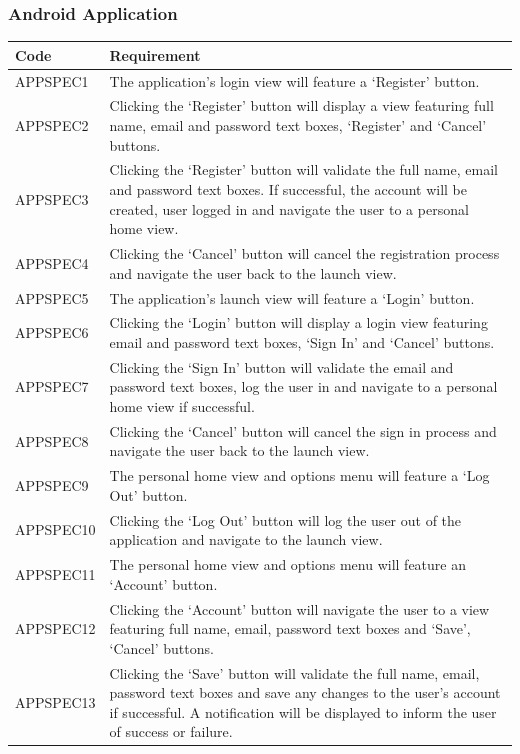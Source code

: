 \documentclass[11pt,a4paper]{article}
\begin{document}
\subsubsection{Android Application}

\begin{longtable}{|p{2.5cm}p{13cm}|}
\hline
\textbf{Code} & \textbf{Requirement} \\

\hline
APPSPEC1 & The application's login view will feature a `Register' button. \\ \hline
APPSPEC2 & Clicking the `Register' button will display a view featuring full name, email and password text boxes, `Register' and `Cancel' buttons. \\ \hline
APPSPEC3 & Clicking the `Register' button will validate the full name, email and password text boxes. If successful, the account will be created, user logged in and navigate the user to a personal home view. \\ \hline
APPSPEC4 & Clicking the `Cancel' button will cancel the registration process and navigate the user back to the launch view. \\ \hline
APPSPEC5 & The application's launch view will feature a `Login' button. \\ \hline
APPSPEC6 & Clicking the `Login' button will display a login view featuring email and password text boxes, `Sign In' and `Cancel' buttons. \\ \hline
APPSPEC7 & Clicking the `Sign In' button will validate the email and password text boxes, log the user in and navigate to a personal home view if successful. \\ \hline
APPSPEC8 & Clicking the `Cancel' button will cancel the sign in process and navigate the user back to the launch view. \\ \hline
APPSPEC9 & The personal home view and options menu will feature a `Log Out' button. \\ \hline
APPSPEC10 & Clicking the `Log Out' button will log the user out of the application and navigate to the launch view. \\ \hline
APPSPEC11 & The personal home view and options menu will feature an `Account' button. \\ \hline
APPSPEC12 & Clicking the `Account' button will navigate the user to a view featuring full name, email, password text boxes and `Save', `Cancel' buttons. \\ \hline
APPSPEC13 & Clicking the `Save' button will validate the full name, email, password text boxes and save any changes to the user's account if successful. A notification will be displayed to inform the user of success or failure. \\ \hline

\end{longtable}
\end{document}
